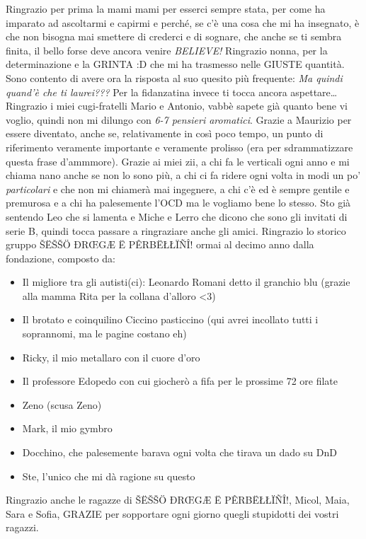 Ringrazio per prima la mami mami per esserci sempre stata, per come ha imparato ad ascoltarmi e capirmi e perché, se c'è una cosa che mi ha insegnato, è che non bisogna mai smettere di crederci e di sognare, che anche se ti sembra finita, il bello forse deve ancora venire \emph{BELIEVE!}
Ringrazio nonna, per la determinazione e la GRINTA :D che mi ha trasmesso nelle GIUSTE quantità. Sono contento di avere ora la risposta al suo quesito più frequente: \emph{Ma quindi quand'è che ti laurei???} Per la fidanzatina invece ti tocca ancora aspettare\dots
Ringrazio i miei cugi-fratelli Mario e Antonio, vabbè sapete già quanto bene vi voglio, quindi non mi dilungo con \emph{6-7 pensieri aromatici}.
Grazie a Maurizio per essere diventato, anche se, relativamente in così poco tempo, un punto di riferimento veramente importante e veramente prolisso (era per sdrammatizzare questa frase d'ammmore).
Grazie ai miei zii, a chi fa le verticali ogni anno e mi chiama nano anche se non lo sono più, a chi ci fa ridere ogni volta in modi un po' \emph{particolari} e che non mi chiamerà mai ingegnere, a chi c'è ed è sempre gentile e premurosa e a chi ha palesemente l'OCD ma le vogliamo bene lo stesso.
Sto già sentendo Leo che si lamenta e Miche e Lerro che dicono che sono gli invitati di serie B, quindi tocca passare a ringraziare anche gli amici.
Ringrazio lo storico gruppo ŠËŠŠÖ ĐRŒGÆ Ë PÊRBËŁŁÏÑÎ! ormai al decimo anno dalla fondazione, composto da: \begin{itemize}
    \item Il migliore tra gli autisti(ci): Leonardo Romani detto il granchio blu (grazie alla mamma Rita per la collana d'alloro <3)
    \item Il brotato e coinquilino Ciccino pasticcino (qui avrei incollato tutti i soprannomi, ma le pagine costano eh)
    \item Ricky, il mio metallaro con il cuore d'oro
    \item Il professore Edopedo con cui giocherò a fifa per le prossime 72 ore filate
    \item Zeno (scusa Zeno)
    \item Mark, il mio gymbro
    \item Docchino, che palesemente barava ogni volta che tirava un dado su DnD
    \item Ste, l'unico che mi dà ragione su questo
\end{itemize}
Ringrazio anche le ragazze di ŠËŠŠÖ ĐRŒGÆ Ë PÊRBËŁŁÏÑÎ!, Micol, Maia, Sara e Sofia, GRAZIE per sopportare ogni giorno quegli stupidotti dei vostri ragazzi.
